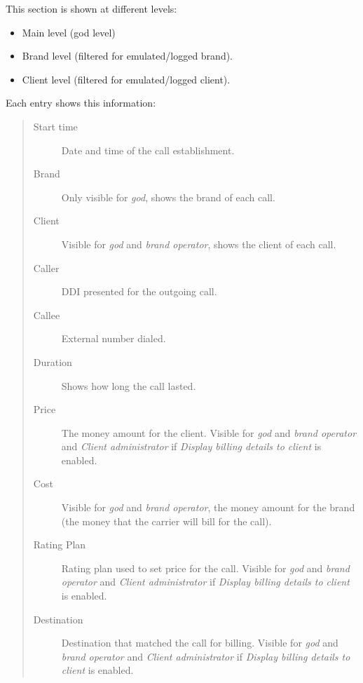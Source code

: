 \documentclass[letterpaper,10pt,english]{sphinxmanual}
\begin{document}
This section is shown at different levels:
\begin{itemize}
\item {} 
Main level (god level)

\item {} 
Brand level (filtered for emulated/logged brand).

\item {} 
Client level (filtered for emulated/logged client).

\end{itemize}

Each entry shows this information:
\begin{quote}
\begin{description}
\item[{Start time}] \leavevmode
Date and time of the call establishment.

\item[{Brand}] \leavevmode
Only visible for \emph{god}, shows the brand of each call.

\item[{Client}] \leavevmode
Visible for \emph{god} and \emph{brand operator}, shows the client of each call.

\item[{Caller}] \leavevmode
DDI presented for the outgoing call.

\item[{Callee}] \leavevmode
External number dialed.

\item[{Duration}] \leavevmode
Shows how long the call lasted.

\item[{Price}] \leavevmode
The money amount for the client. Visible for \emph{god} and \emph{brand operator} and \emph{Client administrator} if
\emph{Display billing details to client} is enabled.

\item[{Cost}] \leavevmode
Visible for \emph{god} and \emph{brand operator}, the money amount for the brand (the money that the carrier will bill for the call).

\item[{Rating Plan}] \leavevmode
Rating plan used to set price for the call. Visible for \emph{god} and \emph{brand operator} and \emph{Client administrator} if
\emph{Display billing details to client} is enabled.

\item[{Destination}] \leavevmode
Destination that matched the call for billing. Visible for \emph{god} and \emph{brand operator} and \emph{Client administrator} if
\emph{Display billing details to client} is enabled.


\end{description}
\end{quote}
\end{document}
